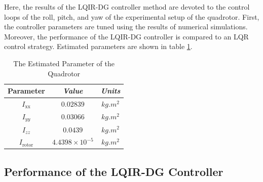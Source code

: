 \documentclass[conference]{IEEEtran}
\begin{document}
Here, the results of the LQIR-DG controller method are devoted to the control loops of the roll, pitch, and yaw of the experimental setup of the quadrotor. First, the controller parameters are tuned using the results of numerical simulations. Moreover, the performance of the LQIR-DG controller is compared to an LQR control strategy. Estimated parameters are shown in table \ref{tab:parameters}.
\begin{table}[!h]
	\renewcommand{\arraystretch}{1.3}
	\caption{The Estimated Parameter of the Quadrotor}
	\begin{center}
	\begin{tabular}{c c c}
	\hline
	\textbf{Parameter} & \textbf{\textit{Value}}& \textbf{\textit{Units}} \\
	\hline
	$I_{\text{xx}}$ & $0.02839$ & $kg.m^2$ \\
	$I_{yy}$  & $0.03066$ & $kg.m^2$\\
	$I_{zz}$  & $0.0439$ & $kg.m^2$ \\
	$I_{\text{rotor}}$  & $4.4398\times 10^{-5}$ & $kg.m^2$\\
	\hline
	\end{tabular}
	\label{tab:parameters}
	\end{center}
\end{table}

\subsection{Performance of the LQIR-DG Controller}
\end{document}
